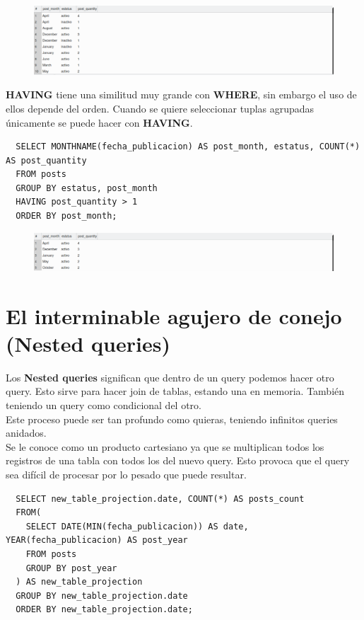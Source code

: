 \documentclass{article}
\begin{document}
\begin{figure}[h!]
  \centering
  \includegraphics[scale=0.5]{./Pictures/131_order_by_month.png}
\end{figure}

\textbf{HAVING} tiene una similitud muy grande con \textbf{WHERE}, sin embargo
el uso de ellos depende del orden. Cuando se quiere seleccionar tuplas
agrupadas únicamente se puede hacer con \textbf{HAVING}.

\begin{verbatim}
  SELECT MONTHNAME(fecha_publicacion) AS post_month, estatus, COUNT(*) AS post_quantity
  FROM posts
  GROUP BY estatus, post_month
  HAVING post_quantity > 1
  ORDER BY post_month;
\end{verbatim}

\newpage

\begin{figure}[h!]
  \centering
  \includegraphics[scale=0.5]{./Pictures/132_order_by_month_having.png}
\end{figure}


\section{El interminable agujero de conejo (Nested queries)}%
Los \textbf{Nested queries} significan que dentro de un query podemos hacer
otro query. Esto sirve para hacer join de tablas, estando una en memoria.
También teniendo un query como condicional del otro.\\

Este proceso puede ser tan profundo como quieras, teniendo infinitos queries anidados.\\
Se le conoce como un producto cartesiano ya que se multiplican todos los
registros de una tabla con todos los del nuevo query. Esto provoca que el
query sea difícil de procesar por lo pesado que puede resultar.

\begin{verbatim}
  SELECT new_table_projection.date, COUNT(*) AS posts_count
  FROM(
    SELECT DATE(MIN(fecha_publicacion)) AS date, YEAR(fecha_publicacion) AS post_year
    FROM posts
    GROUP BY post_year
  ) AS new_table_projection
  GROUP BY new_table_projection.date
  ORDER BY new_table_projection.date;
\end{verbatim}
\end{document}
